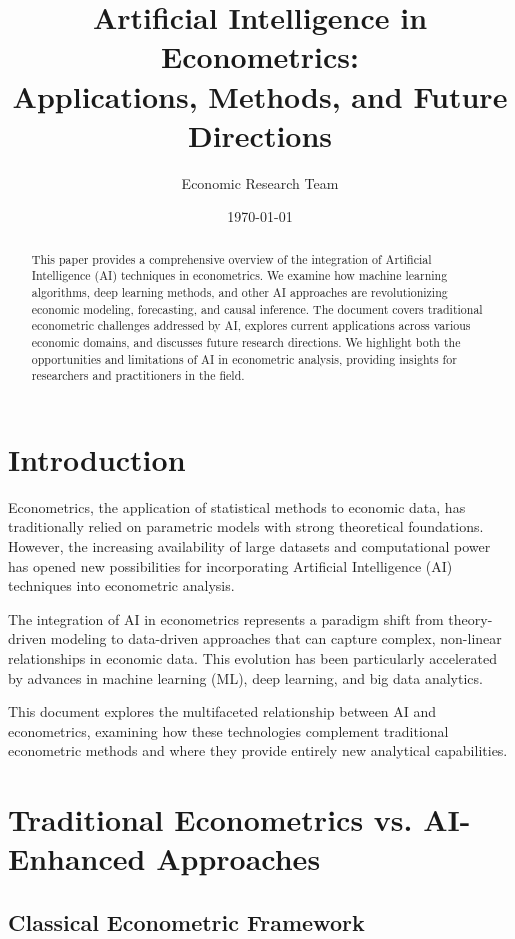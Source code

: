 \documentclass[12pt,a4paper]{article}
\title{\textbf{Artificial Intelligence in Econometrics: \\Applications, Methods, and Future Directions}}
\author{Economic Research Team}
\date{\today}
\begin{document}
\maketitle

\begin{abstract}
This paper provides a comprehensive overview of the integration of Artificial Intelligence (AI) techniques in econometrics. We examine how machine learning algorithms, deep learning methods, and other AI approaches are revolutionizing economic modeling, forecasting, and causal inference. The document covers traditional econometric challenges addressed by AI, explores current applications across various economic domains, and discusses future research directions. We highlight both the opportunities and limitations of AI in econometric analysis, providing insights for researchers and practitioners in the field.
\end{abstract}

\section{Introduction}

Econometrics, the application of statistical methods to economic data, has traditionally relied on parametric models with strong theoretical foundations. However, the increasing availability of large datasets and computational power has opened new possibilities for incorporating Artificial Intelligence (AI) techniques into econometric analysis.

The integration of AI in econometrics represents a paradigm shift from theory-driven modeling to data-driven approaches that can capture complex, non-linear relationships in economic data. This evolution has been particularly accelerated by advances in machine learning (ML), deep learning, and big data analytics.

This document explores the multifaceted relationship between AI and econometrics, examining how these technologies complement traditional econometric methods and where they provide entirely new analytical capabilities.

\section{Traditional Econometrics vs. AI-Enhanced Approaches}

\subsection{Classical Econometric Framework}
\end{document}
